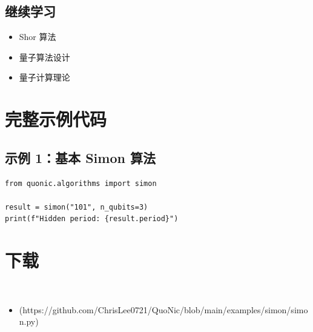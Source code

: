 \documentclass[12pt,a4paper]{article}
\begin{document}
\subsection{继续学习}
\begin{itemize}
  \item Shor 算法
  \item 量子算法设计
  \item 量子计算理论
\end{itemize}

\section{完整示例代码}

\subsection{示例 1：基本 Simon 算法}

\begin{lstlisting}[style=python]
from quonic.algorithms import simon

result = simon("101", n_qubits=3)
print(f"Hidden period: {result.period}")
\end{lstlisting}


\section{下载}

\begin{itemize}
  \item [simon.py](https://github.com/ChrisLee0721/QuoNic/blob/main/examples/simon/simon.py)
\end{itemize}
\end{document}

